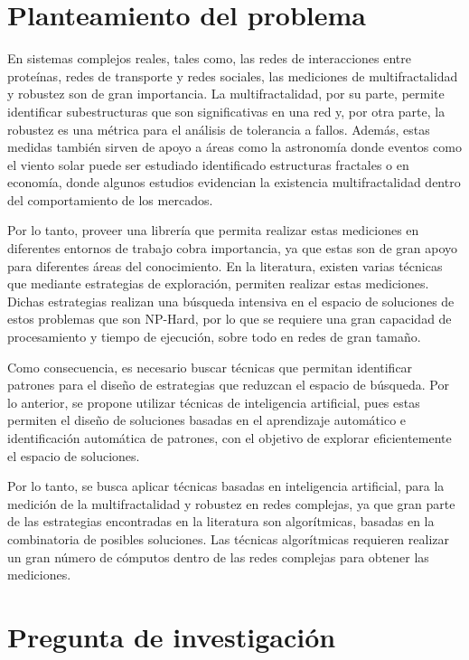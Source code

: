 \section{Planteamiento del problema}

En sistemas complejos reales, tales como, las redes de interacciones entre proteínas, redes de transporte y redes sociales, las mediciones de multifractalidad y robustez son de gran importancia. La multifractalidad, por su parte, permite identificar subestructuras que son significativas en una red\cite{Shuhei2011} y, por otra parte, la robustez es una métrica para el análisis de tolerancia a fallos\cite{Martin-Hernandez2013}. Además, estas medidas también sirven de apoyo a áreas como la astronomía donde eventos como el viento solar puede ser estudiado identificado estructuras fractales\cite{Macek2007} o en economía, donde algunos estudios evidencian la existencia multifractalidad dentro del comportamiento de los mercados\cite{Caraiani2012}.

Por lo tanto, proveer una librería que permita realizar estas mediciones en diferentes entornos de trabajo cobra importancia, ya que estas son de gran apoyo para diferentes áreas del conocimiento. En la literatura, existen varias técnicas que mediante estrategias de exploración, permiten realizar estas mediciones. Dichas estrategias realizan una búsqueda intensiva en el espacio de soluciones de estos problemas que son NP-Hard, por lo que se requiere una gran capacidad de procesamiento y tiempo de ejecución, sobre todo en redes de gran tamaño.

Como consecuencia, es necesario buscar técnicas que permitan identificar patrones para el diseño de estrategias que reduzcan el espacio de búsqueda. Por lo anterior, se propone utilizar técnicas de inteligencia artificial, pues estas permiten el diseño de soluciones basadas en el aprendizaje automático e identificación automática de patrones, con el objetivo de explorar eficientemente el espacio de soluciones.

Por lo tanto, se busca aplicar técnicas basadas en inteligencia artificial, para la medición de la multifractalidad y robustez en redes complejas, ya que gran parte de las estrategias encontradas en la literatura son algorítmicas, basadas en la combinatoria de posibles soluciones. Las técnicas algorítmicas requieren realizar un gran número de cómputos dentro de las redes complejas para obtener las mediciones.

\section{Pregunta de investigación}

